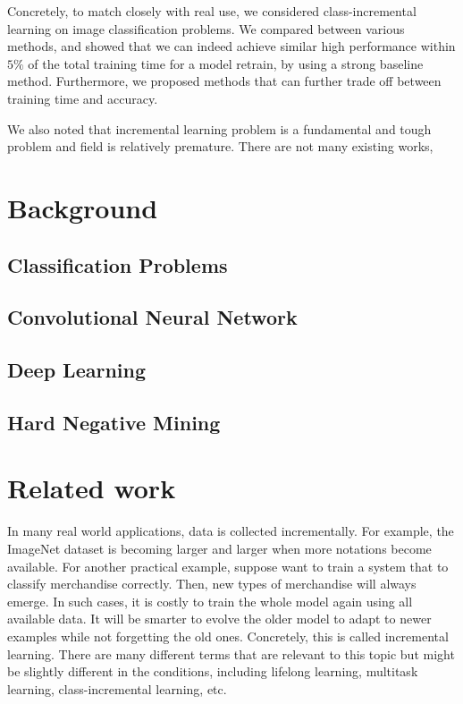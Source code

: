 Concretely, to match closely with real use, we considered class-incremental learning on image classification problems. We compared between various methods, and showed that we can indeed achieve similar high performance within $5\%$ of the total training time for a model retrain, by using a strong baseline method. Furthermore, we proposed methods that can further trade off between training time and accuracy.

We also noted that incremental learning problem is a fundamental and tough problem and field is relatively premature. There are not many existing works, 

\section{Background}

\subsection{Classification Problems}
\subsection{Convolutional Neural Network}
\subsection{Deep Learning}
\subsection{Hard Negative Mining}

\section{Related work}
In many real world applications, data is collected incrementally. For example, the ImageNet dataset is becoming larger and larger when more notations become available. For another practical example, suppose want to train a system that to classify merchandise correctly. Then, new types of merchandise will always emerge. In such cases, it is costly to train the whole model again using all available data. It will be smarter to evolve the older model to adapt to newer examples while not forgetting the old ones. Concretely, this is called incremental learning. There are many different terms that are relevant to this topic but might be slightly different in the conditions, including lifelong learning, multitask learning, class-incremental learning, etc.\cite{utgoff1989incremental}

